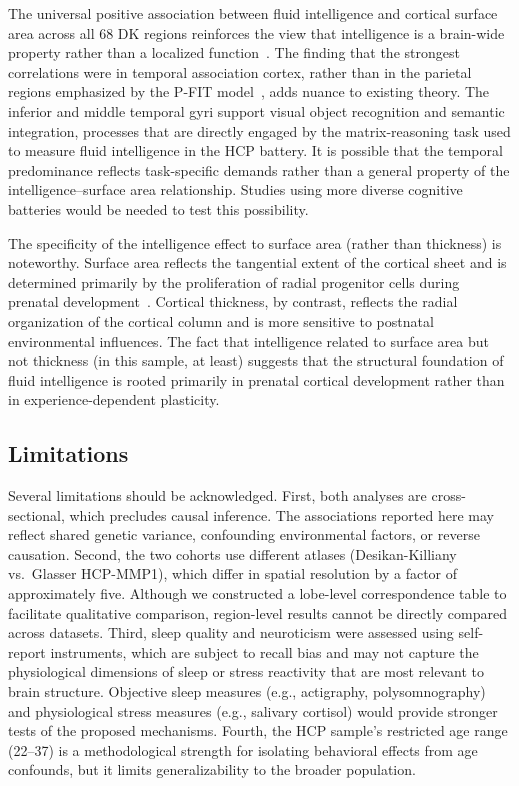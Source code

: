 The universal positive association between fluid intelligence and cortical surface area across all 68 DK regions reinforces the view that intelligence is a brain-wide property rather than a localized function~\cite{deary2010neuroscience}.
The finding that the strongest correlations were in temporal association cortex, rather than in the parietal regions emphasized by the P-FIT model~\cite{jung2007pfit}, adds nuance to existing theory.
The inferior and middle temporal gyri support visual object recognition and semantic integration, processes that are directly engaged by the matrix-reasoning task used to measure fluid intelligence in the HCP battery.
It is possible that the temporal predominance reflects task-specific demands rather than a general property of the intelligence--surface area relationship.
Studies using more diverse cognitive batteries would be needed to test this possibility.

The specificity of the intelligence effect to surface area (rather than thickness) is noteworthy.
Surface area reflects the tangential extent of the cortical sheet and is determined primarily by the proliferation of radial progenitor cells during prenatal development~\cite{grasby2020genetic}.
Cortical thickness, by contrast, reflects the radial organization of the cortical column and is more sensitive to postnatal environmental influences.
The fact that intelligence related to surface area but not thickness (in this sample, at least) suggests that the structural foundation of fluid intelligence is rooted primarily in prenatal cortical development rather than in experience-dependent plasticity.

\subsection{Limitations}

Several limitations should be acknowledged.
First, both analyses are cross-sectional, which precludes causal inference.
The associations reported here may reflect shared genetic variance, confounding environmental factors, or reverse causation.
Second, the two cohorts use different atlases (Desikan-Killiany vs.\ Glasser HCP-MMP1), which differ in spatial resolution by a factor of approximately five.
Although we constructed a lobe-level correspondence table to facilitate qualitative comparison, region-level results cannot be directly compared across datasets.
Third, sleep quality and neuroticism were assessed using self-report instruments, which are subject to recall bias and may not capture the physiological dimensions of sleep or stress reactivity that are most relevant to brain structure.
Objective sleep measures (e.g., actigraphy, polysomnography) and physiological stress measures (e.g., salivary cortisol) would provide stronger tests of the proposed mechanisms.
Fourth, the HCP sample's restricted age range (22--37) is a methodological strength for isolating behavioral effects from age confounds, but it limits generalizability to the broader population.

